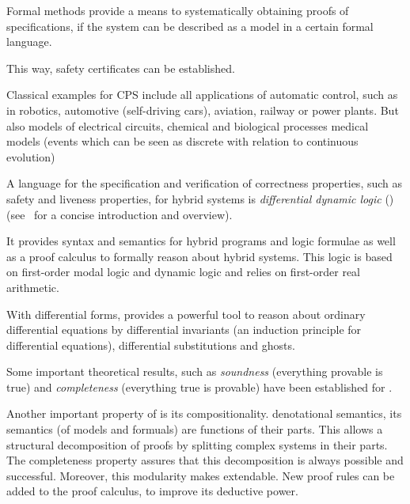     Formal methods provide a means to systematically obtaining proofs of specifications, if the system can be described as a model in a certain formal language.
    
    This way, safety certificates can be established.

    

    
    Classical examples for CPS include all applications of automatic control, such as in robotics, automotive (self-driving cars), aviation, railway or power plants.
    But also models of electrical circuits, chemical and biological processes
    medical models
    (events which can be seen as discrete with relation to continuous evolution)


    A language for the specification and verification of correctness properties, such as safety and liveness properties,
    for hybrid systems is \emph{differential dynamic logic} (\dL)
    (see~\cite{Platzer12LogicsDynSys} for a concise introduction and overview).

    It provides syntax and semantics for hybrid programs and logic formulae as well as a proof calculus to formally reason about hybrid systems.
    This logic is based on first-order modal logic and dynamic logic and relies on first-order real arithmetic.

    
    With differential forms, \dL provides a powerful tool to reason about ordinary differential equations by differential invariants (an induction principle for differential equations), differential substitutions and ghosts.    

    Some important theoretical results, such as \emph{soundness} (everything provable is true) and \emph{completeness} (everything true is provable) have been established for \dL.

    Another important property of \dL is its compositionality.
    denotational semantics, its semantics (of models and formuals) are functions of their parts.
    This allows a structural decomposition of proofs by splitting complex systems in their parts.
    The completeness property assures that this decomposition is always possible and successful.
    Moreover, this modularity makes \dL extendable. New proof rules can be added to the proof calculus, to improve its deductive power.

